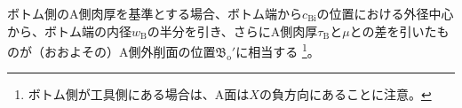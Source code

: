 ボトム側のA側肉厚を基準とする場合、ボトム端から$c_\mathrm{Bi}$の位置における外径中心から、ボトム端の内径$w_\mathrm B$の半分を引き、さらにA側肉厚$\tau_\mathrm B$と\PlatingThk$\mu$との差を引いたものが（おおよその）A側外削面の位置$\mathfrak B_\mathrm o'$に相当する
\footnote{ボトム側が工具側にある場合は、A面は$X$の負方向にあることに注意。}。


